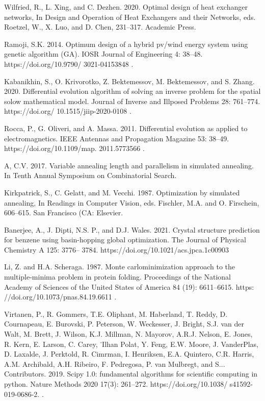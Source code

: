 \documentclass[default,iicol]{sn-jnl}
\theoremstyle{thmstyleone}
\theoremstyle{thmstyletwo}
\theoremstyle{thmstylethree}
\begin{document}
\begin{thebibliography}{99}
Wilfried, R., L. Xing, and C. Dezhen. 2020. Optimal design of heat exchanger networks, In Design and Operation of Heat Exchangers and their Networks, eds. Roetzel, W., X. Luo, and D. Chen, 231–317. Academic Press.


  Ramoji, S.K. 2014. Optimum design of a
hybrid pv/wind energy system using genetic
algorithm (GA). IOSR Journal of Engineering 4: 38–48. https://doi.org/10.9790/
3021-04153848 .


Kabanikhin, S., O. Krivorotko, Z. Bektemessov, M. Bektemessov, and S. Zhang. 2020.
Differential evolution algorithm of solving an
inverse problem for the spatial solow mathematical model. Journal of Inverse and Illposed Problems 28: 761–774. https://doi.org/
10.1515/jiip-2020-0108 .

Rocca, P., G. Oliveri, and A. Massa. 2011.
Differential evolution as applied to electromagnetics. IEEE Antennas and Propagation Magazine 53: 38–49. https://doi.org/10.1109/map.
2011.5773566 .


  A, C.V. 2017. Variable annealing length and
parallelism in simulated annealing. In Tenth
Annual Symposium on Combinatorial Search.



  Kirkpatrick, S., C. Gelatt, and M. Vecchi.
1987. Optimization by simulated annealing,
In Readings in Computer Vision, eds. Fischler,
M.A. and O. Firschein, 606–615. San Francisco
(CA: Elsevier.

  Banerjee, A., J. Dipti, N.S. P., and D.J. Wales.
2021. Crystal structure prediction for benzene
using basin-hopping global optimization. The
Journal of Physical Chemistry A 125: 3776–
3784. https://doi.org/10.1021/acs.jpca.1c00903


  Li, Z. and H.A. Scheraga. 1987. Monte carlominimization approach to the multiple-minima
problem in protein folding. Proceedings of the
National Academy of Sciences of the United
States of America 84 (19): 6611–6615. https:
//doi.org/10.1073/pnas.84.19.6611 .



  Virtanen, P., R. Gommers, T.E. Oliphant,
M. Haberland, T. Reddy, D. Cournapeau,
E. Burovski, P. Peterson, W. Weckesser,
J. Bright, S.J. van der Walt, M. Brett, J. Wilson, K.J. Millman, N. Mayorov, A.R.J. Nelson, E. Jones, R. Kern, E. Larson, C. Carey,
˙Ilhan Polat, Y. Feng, E.W. Moore, J. VanderPlas, D. Laxalde, J. Perktold, R. Cimrman, I. Henriksen, E.A. Quintero, C.R. Harris,
A.M. Archibald, A.H. Ribeiro, F. Pedregosa,
P. van Mulbregt, and S... Contributors. 2019.
Scipy 1.0: fundamental algorithms for scientific computing in python. Nature Methods
2020 17(3): 261–272. https://doi.org/10.1038/
s41592-019-0686-2. .




\end{thebibliography}
\end{document}
